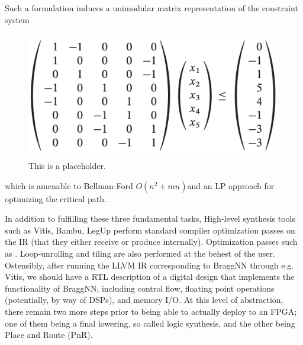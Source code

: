 Such a formulation induces a unimodular matrix representation of the constraint system
\begin{figure}
	\includegraphics[width=\columnwidth]{figures/unimodular}
	\caption{This is a placeholder.}
\end{figure}
which is amenable to Bellman-Ford $O(n^2 + mn)$and an LP approach for optimizing the critical path\cite{1688836}.

In addition to fulfilling these three fundamental tasks, High-level synthesis tools such as Vitis, Bambu\cite{ferrandi2021bambu}, LegUp\cite{10.1145/2514740} perform standard compiler optimization passes on the IR (that they either receive or produce internally).
Optimization passes such as .
Loop-unrolling and tiling are also performed at the behest of the user.
Ostensibly, after running the LLVM IR corresponding to BraggNN through e.g. Vitis, we should have a RTL description of a digital design that implements the functionality of BraggNN, including control flow, floating point operations (potentially, by way of DSPs), and memory I/O.
At this level of abstraction, there remain two more steps prior to being able to actually deploy to an FPGA; one of them being a final lowering, so called logic synthesis, and the other being Place and Route (PnR).

